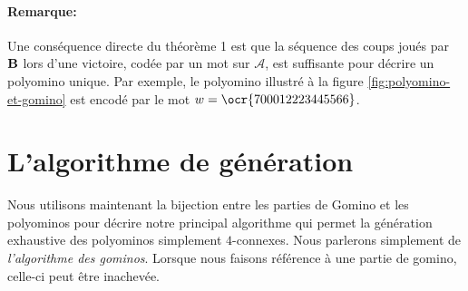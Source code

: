 \paragraph*{Remarque:} Une conséquence directe du théorème 1 est que la séquence des coups joués par $\mathbf{B}$ lors d'une victoire, codée par un mot sur $\mathcal{A}$, est suffisante pour décrire un polyomino unique. Par exemple, le polyomino illustré à la figure \ref{fig:polyomino-et-gomino} est encodé par le mot $w=\ocr{700012223445566}$.



\section{L'algorithme de génération}

\vspace{-0.5em}
Nous utilisons maintenant la bijection entre les parties de Gomino et les polyominos pour décrire notre principal algorithme qui permet la génération exhaustive des polyominos simplement $4$-connexes. Nous parlerons simplement de \emph{l'algorithme des gominos}. Lorsque nous faisons référence à une partie de gomino, celle-ci peut être inachevée.

\vspace{-0.5em}
